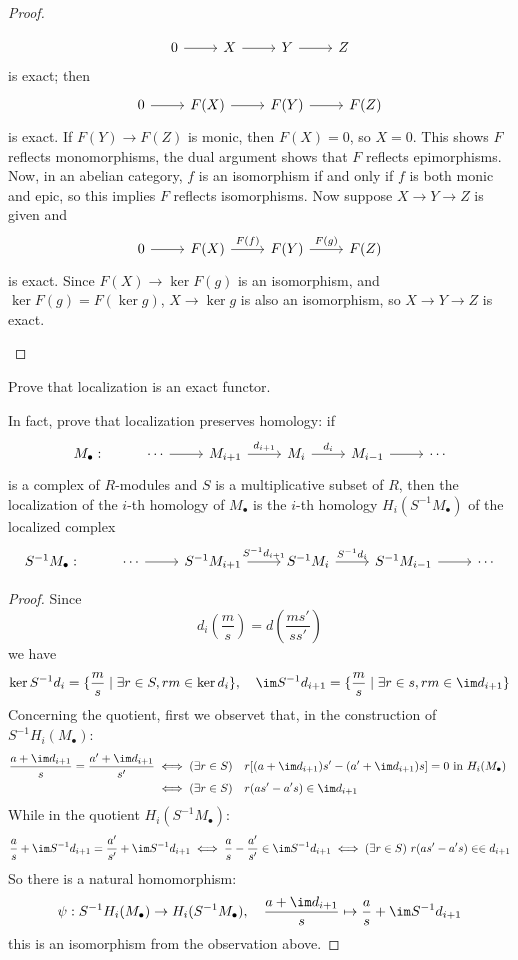 \begin{proof}
\begin{enumerate}
\[\begin{tikzcd}
0\ar[r]&X\ar[r]&Y\ar[r]&Z
\end{tikzcd}\]
is exact; then
\[\begin{tikzcd}
0\ar[r]&F(X)\ar[r]&F(Y)\ar[r]&F(Z)
\end{tikzcd}\]
is exact. If $F(Y)\to F(Z)$ is monic, then $F(X)=0$, so $X=0$. This shows $F$ reflects monomorphisms, the dual argument shows that $F$ reflects epimorphisms. Now, in an abelian category, $f$ is an isomorphism if and only if $f$ is both monic and epic, so this implies $F$ reflects isomorphisms. Now suppose $X\to Y\to Z$ is given and
\[\begin{tikzcd}
0\ar[r]&F(X)\ar[r,"F(f)"]&F(Y)\ar[r,"F(g)"]&F(Z)
\end{tikzcd}\]
is exact. Since $F(X)\to\ker F(g)$ is an isomorphism, and $\ker F(g)=F(\ker g)$, $X\to\ker g$ is also an isomorphism, so $X\to Y\to Z$ is exact.
\end{enumerate}
\end{proof}
\begin{exercise}\label{locali exact}
Prove that localization is an exact functor.\par
In fact, prove that localization preserves homology: if
\[\begin{tikzcd}
M_{\bullet}:&\cdots\ar[r]&M_{i+1}\ar[r,"d_{i+1}"]&M_i\ar[r,"d_i"]&M_{i-1}\ar[r]&\cdots
\end{tikzcd}\]
is a complex of $R$-modules and $S$ is a multiplicative subset of $R$, then the localization of the $i$-th homology of $M_{\bullet}$ is the $i$-th homology $H_i(S^{-1}M_{\bullet})$ of the localized complex
\[\begin{tikzcd}
S^{-1}M_{\bullet}:&\cdots\ar[r]&S^{-1}M_{i+1}\ar[r,"S^{-1}d_{i+1}"]&S^{-1}M_i\ar[r,"S^{-1}d_i"]&S^{-1}M_{i-1}\ar[r]&\cdots
\end{tikzcd}\]
\end{exercise}
\begin{proof}
Since 
\[d_i(\dfrac{m}{s})=d(\dfrac{ms'}{ss'})\]
we have
\[\ker S^{-1}d_i=\{\dfrac{m}{s}\mid \exists r\in S, rm\in\ker d_i\},\quad\im S^{-1}d_{i+1}=\{\dfrac{m}{s}\mid\exists r\in s, rm\in\im d_{i+1}\}\]
Concerning the quotient, first we observet that, in the construction of $S^{-1}H_i(M_{\bullet})$:
\begin{align*}
\dfrac{a+\im d_{i+1}}{s}=\dfrac{a'+\im d_{i+1}}{s'}&\iff (\exists r\in S)\quad r[(a+\im d_{i+1})s'-(a'+\im d_{i+1})s]=0\text{ in $H_i(M_{\bullet})$ }\\
&\iff (\exists r\in S)\quad r(as'-a's)\in\im d_{i+1}\end{align*}
While in the quotient $H_i(S^{-1}M_{\bullet})$:
\[\dfrac{a}{s}+\im S^{-1}d_{i+1}=\dfrac{a'}{s'}+\im S^{-1}d_{i+1}\iff \dfrac{a}{s}-\dfrac{a'}{s'}\in\im S^{-1}d_{i+1}\iff (\exists r\in S)\  r(as'-a's)\in\in d_{i+1}\]
So there is a natural homomorphism:
\[\psi:S^{-1}H_i(M_{\bullet})\to H_i(S^{-1}M_{\bullet}),\quad \dfrac{a+\im d_{i+1}}{s}\mapsto\dfrac{a}{s}+\im S^{-1}d_{i+1}\]
this is an isomorphism from the observation above.
\end{proof}
